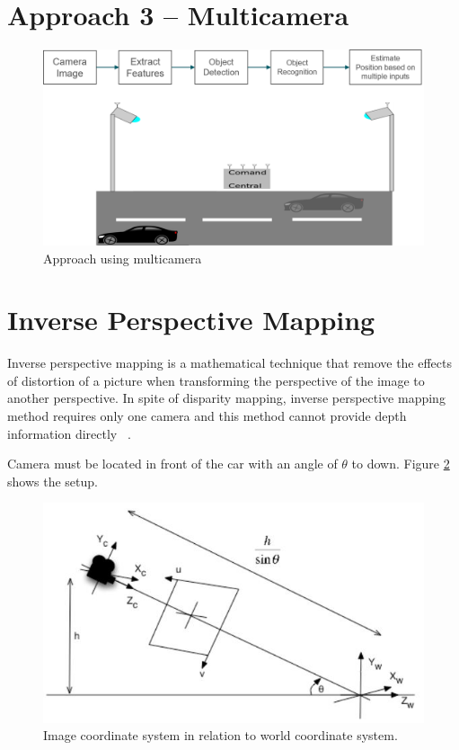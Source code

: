\section{Approach 3 – Multicamera}\label{sub:3}
\begin{figure}[H]
\centering
\includegraphics[width=\textwidth]{imagens/proposal3.png}
\caption{Approach using multicamera}
\label{fig:proposal3}
\end{figure}



\section{Inverse Perspective Mapping }
Inverse perspective mapping is a mathematical technique that remove the effects of distortion of a picture when transforming the perspective of the image to another perspective. In spite of disparity mapping, inverse perspective mapping method requires only one camera and this method cannot provide depth information directly ~\cite{Tuohy2010}.

Camera must be located in front of the car with an angle of \(\theta\) to down. Figure \ref{fig:ImageRelationSystem} shows the setup.

\begin{figure}[h]
\centering
\includegraphics[scale=0.5]{imagens/Inverse Perspective Mapping.JPG}
\caption{Image coordinate system in relation to world coordinate
system.}
\label{fig:ImageRelationSystem}
\end{figure}
\par


